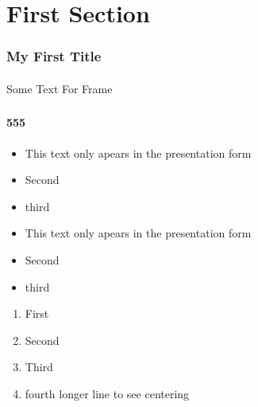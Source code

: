 
\begin{comment}
*  [[elisp:(org-cycle)][| ]]  [[elisp:(blee:ppmm:org-mode-toggle)][Nat]] [[elisp:(beginning-of-buffer)][Top]] [[elisp:(delete-other-windows)][(1)]] || /Section/  First Section ::  [[elisp:(org-cycle)][| ]]
\end{comment}

\section{First Section}


\begin{comment}
*****  [[elisp:(org-cycle)][| ]]  [[elisp:(blee:ppmm:org-mode-toggle)][Nat]] [[elisp:(beginning-of-buffer)][Top]] [[elisp:(delete-other-windows)][(1)]] || /Frame/  My First Title ::  [[elisp:(org-cycle)][| ]]
\end{comment}

\begin{frame}[label=myTitle]
    \frametitle{My First Title}
    \framesubtitle{}

Some Text For Frame
\end{frame}

\begin{frame}[label=ignore]
  \frametitle{}
  \framesubtitle{555}
  \begin{itemize}
  \item This text only apears in the presentation form
  \item Second
  \item third
  \item This text only apears in the presentation form
  \item Second
  \item third
  \end{itemize}
\begin{enumerate}
\item First
\item Second
\item Third
\item fourth longer line to see centering
\end{enumerate}
\end{frame}

